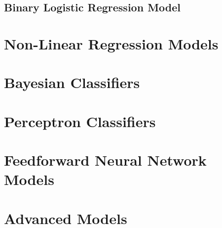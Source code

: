 \documentclass[a4paper,english]{article}
\begin{document}
\subsection{Binary Logistic Regression Model}

\section{Non-Linear Regression Models}

\section{Bayesian Classifiers}

\section{Perceptron Classifiers}

\section{Feedforward Neural Network Models}

\section{Advanced Models}
\end{document}
